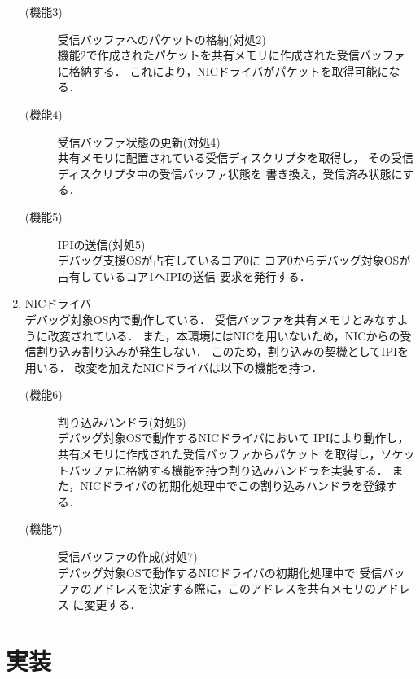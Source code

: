 \documentclass[tanilab-enum]{graduate}
\begin{document}
\begin{enumerate}
\begin{description}
            \item[(機能3)]受信バッファへのパケットの格納(対処2)\\
                機能2で作成されたパケットを共有メモリに作成された受信バッファに格納する．
                これにより，NICドライバがパケットを取得可能になる．
            \item[(機能4)]受信バッファ状態の更新(対処4)\\
                共有メモリに配置されている受信ディスクリプタを取得し，
                その受信ディスクリプタ中の受信バッファ状態を
                書き換え，受信済み状態にする．
            \item[(機能5)]IPIの送信(対処5)\\
                デバッグ支援OSが占有しているコア0に
                コア0からデバッグ対象OSが占有しているコア1へIPIの送信
                要求を発行する．
        \end{description}
    \item NICドライバ\\
        デバッグ対象OS内で動作している．
        受信バッファを共有メモリとみなすように改変されている．
        また，本環境にはNICを用いないため，NICからの受信割り込み割り込みが発生しない．
        このため，割り込みの契機としてIPIを用いる．
        改変を加えたNICドライバは以下の機能を持つ．
        \begin{description}
            \item[(機能6)]割り込みハンドラ(対処6)\\
                デバッグ対象OSで動作するNICドライバにおいて
                IPIにより動作し，共有メモリに作成された受信バッファからパケット
                を取得し，ソケットバッファに格納する機能を持つ割り込みハンドラを実装する．
                また，NICドライバの初期化処理中でこの割り込みハンドラを登録する．
            \item[(機能7)]受信バッファの作成(対処7)\\
                デバッグ対象OSで動作するNICドライバの初期化処理中で
                受信バッファのアドレスを決定する際に，このアドレスを共有メモリのアドレス
                に変更する．
        \end{description}
\end{enumerate}


\chapter{実装}\label{chap:implementation}
\end{document}
